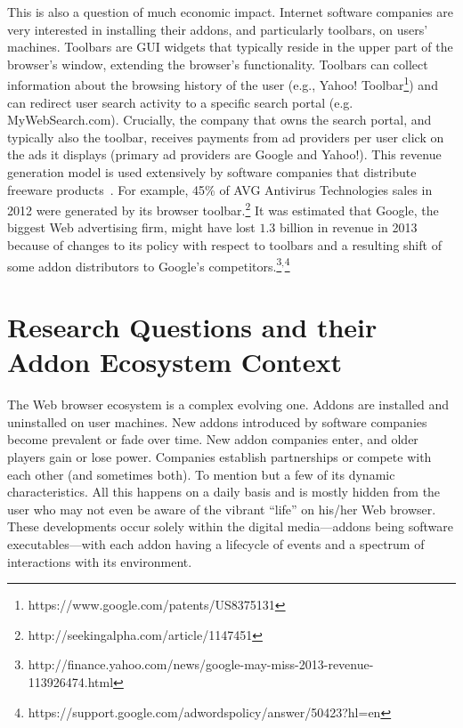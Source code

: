 \documentclass[10pt,letterpaper]{article}
\begin{document}
This is also a question of much economic impact. Internet software companies are very interested in installing their addons, and particularly toolbars, on users’ machines. Toolbars are GUI widgets that typically reside in the upper part of the browser’s window, extending the browser’s functionality. Toolbars can collect information about the browsing history of the user (e.g., Yahoo! Toolbar\footnote{ https://www.google.com/patents/US8375131}) and can redirect user search activity to a specific search portal (e.g. MyWebSearch.com). Crucially, the company that owns the search portal, and typically also the toolbar, receives payments from ad providers per user click on the ads it displays (primary ad providers are Google and Yahoo!). This revenue generation model is used extensively by software companies that distribute freeware products~\cite{leontiadis2012don}. For example, 45\% of AVG Antivirus Technologies sales in 2012 were generated by its browser toolbar.\footnote{ http://seekingalpha.com/article/1147451}  It was estimated that Google, the biggest Web advertising firm, might have lost $1.3$ billion in revenue in 2013 because of changes to its policy with respect to toolbars and a resulting shift of some addon distributors to Google’s competitors.\footnote{ http://finance.yahoo.com/news/google-may-miss-2013-revenue-113926474.html}$^{,}$\footnote{ https://support.google.com/adwordspolicy/answer/50423?hl=en}

\section*{Research Questions and their Addon Ecosystem Context}

The Web browser ecosystem is a complex evolving one. Addons are installed and uninstalled on user machines. New addons introduced by software companies become prevalent or fade over time. New addon companies enter, and older players gain or lose power. Companies establish partnerships or compete with each other (and sometimes both). To mention but a few of its dynamic characteristics. All this happens on a daily basis and is mostly hidden from the user who may not even be aware of the vibrant ``life'' on his/her Web browser. These developments occur solely within the digital media---addons being software executables---with each addon having a lifecycle of events and a spectrum of interactions with its environment. 
\end{document}
